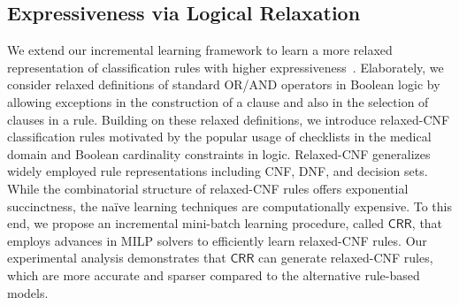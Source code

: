 \subsection*{Expressiveness via Logical Relaxation}
We extend our incremental learning framework to learn a more relaxed representation of classification rules with higher expressiveness~\cite{GMM2020}. Elaborately, we consider relaxed definitions of standard OR/AND operators in Boolean logic by allowing exceptions in the construction of a clause and also in the selection of clauses in a rule. Building on these relaxed definitions, we introduce relaxed-CNF classification rules motivated by the popular usage of checklists in the medical domain and Boolean cardinality constraints in logic. Relaxed-CNF generalizes widely employed rule representations including CNF, DNF, and decision sets. While the combinatorial structure of relaxed-CNF rules offers exponential succinctness, the na\"ive learning techniques are computationally expensive. To this end, we propose an incremental mini-batch learning procedure, called $ \mathsf{CRR} $, that employs advances in MILP solvers to efficiently learn relaxed-CNF rules. Our experimental analysis demonstrates that $ \mathsf{CRR} $ can generate relaxed-CNF rules, which are more accurate and sparser compared to the alternative rule-based models.








